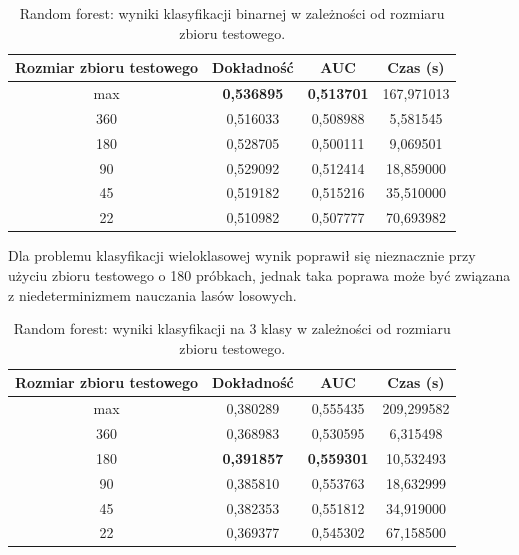 \documentclass[a4paper, twoside, 11pt, openright]{article}
\begin{document}
\begin{table}[H]
    \centering
    \begin{tabular}{|c|c|c|c|}
    \hline
        \textbf{Rozmiar zbioru testowego} & \textbf{Dokładność} & \textbf{AUC} & \textbf{Czas (s)} \\ \hline
max                         & \textbf{0,536895} &  \textbf{0,513701} &  167,971013 \\ \hline
360                         &  0,516033 &  0,508988 &    5,581545 \\ \hline
180                         &  0,528705 &  0,500111 &    9,069501 \\ \hline
90                          &  0,529092 &  0,512414 &   18,859000 \\ \hline
45                          &  0,519182 &  0,515216 &   35,510000 \\ \hline
22                          &  0,510982 &  0,507777 &   70,693982 \\ \hline

    \end{tabular}
    \caption{Random forest: wyniki klasyfikacji binarnej w zależności od rozmiaru zbioru testowego.}
    \label{tab:rf_walk_forward_binary}
\end{table}

Dla problemu klasyfikacji wieloklasowej wynik poprawił się nieznacznie przy użyciu zbioru testowego o 180 próbkach, jednak taka poprawa może być związana z niedeterminizmem nauczania lasów losowych.

\begin{table}[H]
    \centering
    \begin{tabular}{|c|c|c|c|}
    \hline
        \textbf{Rozmiar zbioru testowego} & \textbf{Dokładność} & \textbf{AUC} & \textbf{Czas (s)} \\ \hline
max                         &   0,380289 &  0,555435 &  209,299582 \\ \hline
360                         &  0,368983 &  0,530595 &    6,315498 \\ \hline
180                         &  \textbf{0,391857} &  \textbf{0,559301} &   10,532493 \\ \hline
90                          &  0,385810 &  0,553763 &   18,632999 \\ \hline
45                          &  0,382353 &  0,551812 &   34,919000 \\ \hline
22                          &  0,369377 &  0,545302 &   67,158500 \\ \hline
    \end{tabular}
    \caption{Random forest: wyniki klasyfikacji na 3 klasy w zależności od rozmiaru zbioru testowego.}
    \label{tab:rf_walk_forward_discrete}
\end{table}
\end{document}
